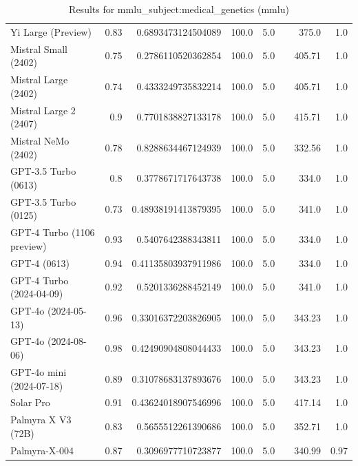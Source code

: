 \begin{table}[htp]
{\begin{tabular}{lrrrrrrr}
Yi Large (Preview) & 0.83 & 0.6893473124504089 & 100.0 & 5.0 &  & 375.0 & 1.0 \\
Mistral Small (2402) & 0.75 & 0.2786110520362854 & 100.0 & 5.0 &  & 405.71 & 1.0 \\
Mistral Large (2402) & 0.74 & 0.4333249735832214 & 100.0 & 5.0 &  & 405.71 & 1.0 \\
Mistral Large 2 (2407) & 0.9 & 0.7701838827133178 & 100.0 & 5.0 &  & 415.71 & 1.0 \\
Mistral NeMo (2402) & 0.78 & 0.8288634467124939 & 100.0 & 5.0 &  & 332.56 & 1.0 \\
GPT-3.5 Turbo (0613) & 0.8 & 0.3778671717643738 & 100.0 & 5.0 &  & 334.0 & 1.0 \\
GPT-3.5 Turbo (0125) & 0.73 & 0.48938191413879395 & 100.0 & 5.0 &  & 341.0 & 1.0 \\
GPT-4 Turbo (1106 preview) & 0.93 & 0.5407642388343811 & 100.0 & 5.0 &  & 334.0 & 1.0 \\
GPT-4 (0613) & 0.94 & 0.41135803937911986 & 100.0 & 5.0 &  & 334.0 & 1.0 \\
GPT-4 Turbo (2024-04-09) & 0.92 & 0.5201336288452149 & 100.0 & 5.0 &  & 341.0 & 1.0 \\
GPT-4o (2024-05-13) & 0.96 & 0.33016372203826905 & 100.0 & 5.0 &  & 343.23 & 1.0 \\
GPT-4o (2024-08-06) & 0.98 & 0.42490904808044433 & 100.0 & 5.0 &  & 343.23 & 1.0 \\
GPT-4o mini (2024-07-18) & 0.89 & 0.31078683137893676 & 100.0 & 5.0 &  & 343.23 & 1.0 \\
Solar Pro & 0.91 & 0.43624018907546996 & 100.0 & 5.0 &  & 417.14 & 1.0 \\
Palmyra X V3 (72B) & 0.83 & 0.5655512261390686 & 100.0 & 5.0 &  & 352.71 & 1.0 \\
Palmyra-X-004 & 0.87 & 0.3096977710723877 & 100.0 & 5.0 &  & 340.99 & 0.97 \\
\bottomrule
\end{tabular}}
\caption{Results for mmlu_subject:medical_genetics (mmlu)}
\label{fig:mmlu_subject:medical_genetics (mmlu)}
\end{table}